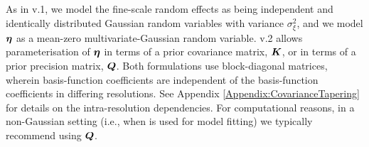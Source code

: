 \documentclass[nojss]{jss}
\def\mbf#1{{%
\mathchoice%
{\hbox{\boldmath$\displaystyle{#1}$}}%
{\hbox{\boldmath$\textstyle{#1}$}}%
{\hbox{\boldmath$\scriptstyle{#1}$}}%
{\hbox{\boldmath$\scriptscriptstyle{#1}$}}%
}}
\def\vec{\mbf}
\begin{document}



As in  v.1, we model the fine-scale random effects as being independent and identically distributed Gaussian random variables with variance $\sigma^2_\xi$, and we model $\vec{\eta}$ as a mean-zero multivariate-Gaussian random variable. 
  v.2 allows parameterisation of $\vec{\eta}$ in terms of a prior covariance matrix, $\vec{K}$, or in terms of a prior precision matrix, $\vec{Q}$. 
 Both formulations use block-diagonal matrices, wherein basis-function coefficients are independent of the basis-function coefficients in differing resolutions. See Appendix \ref{Appendix:CovarianceTapering} for details on the intra-resolution dependencies. 
  For computational reasons, 
  in a non-Gaussian setting (i.e., when  is used for model fitting) 
  we typically recommend using $\vec{Q}$. 

 
\end{document}
